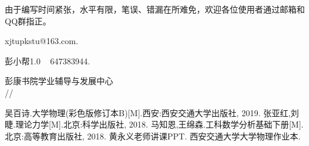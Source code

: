 \documentclass[cn,10pt,toc=twocol,device=pad,citestyle=gb7714-2015,bibstyle=gb7714-2015]{elegantbook}
\renewcommand{\today}{\number\year/\number\month/\number\day}
\begin{document}
由于编写时间紧张，水平有限，笔误、错漏在所难免，欢迎各位使用者通过邮箱和QQ群指正。

\vskip 0.3cm

\faEnvelope \quad xjtupkstu@163.com. 

\faQq \quad 彭小帮1.0 ~ 647383944.  

\begin{flushright}
彭康书院学业辅导与发展中心\\
\today
\end{flushright}



	
	
	

\tableofcontents

\mainmatter



















\clearpage
{}
{}
\begin{thebibliography}{99}  
	吴百诗.大学物理(彩色版修订本B)[M].西安:西安交通大学出版社, 2019. 
	张亚红,刘睫.理论力学[M].北京:科学出版社, 2018. 
	马知恩,王绵森.工科数学分析基础下册[M].北京:高等教育出版社, 2018. 
	黄永义老师讲课PPT.
	西安交通大学大学物理作业本. 
\end{thebibliography}

\nocite{*} 
\end{document}
